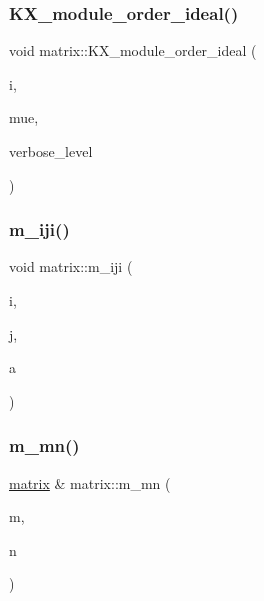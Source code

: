\mbox{\label{classmatrix_a69a80605be7914af5fd65e680944aeca}} 
\subsubsection{\texorpdfstring{K\+X\+\_\+module\+\_\+order\+\_\+ideal()}{KX\_module\_order\_ideal()}}
{\footnotesize\ttfamily void matrix\+::\+K\+X\+\_\+module\+\_\+order\+\_\+ideal (\begin{DoxyParamCaption}\item[{\mbox{\hyperlink{galois_8h_a09fddde158a3a20bd2dcadb609de11dc}{I\+NT}}}]{i,  }\item[{\mbox{\hyperlink{classunipoly}{unipoly}} \&}]{mue,  }\item[{\mbox{\hyperlink{galois_8h_a09fddde158a3a20bd2dcadb609de11dc}{I\+NT}}}]{verbose\+\_\+level }\end{DoxyParamCaption})}

\mbox{\label{classmatrix_a8cece141dbb3d39e94933c8da46dbd50}} 
\subsubsection{\texorpdfstring{m\+\_\+iji()}{m\_iji()}}
{\footnotesize\ttfamily void matrix\+::m\+\_\+iji (\begin{DoxyParamCaption}\item[{\mbox{\hyperlink{galois_8h_a09fddde158a3a20bd2dcadb609de11dc}{I\+NT}}}]{i,  }\item[{\mbox{\hyperlink{galois_8h_a09fddde158a3a20bd2dcadb609de11dc}{I\+NT}}}]{j,  }\item[{\mbox{\hyperlink{galois_8h_a09fddde158a3a20bd2dcadb609de11dc}{I\+NT}}}]{a }\end{DoxyParamCaption})\hspace{0.3cm}{\ttfamily [inline]}}

\mbox{\label{classmatrix_a85921e1b3c604f625989b1c3d1697792}} 
\subsubsection{\texorpdfstring{m\+\_\+mn()}{m\_mn()}}
{\footnotesize\ttfamily \mbox{\hyperlink{classmatrix}{matrix}} \& matrix\+::m\+\_\+mn (\begin{DoxyParamCaption}\item[{\mbox{\hyperlink{galois_8h_a09fddde158a3a20bd2dcadb609de11dc}{I\+NT}}}]{m,  }\item[{\mbox{\hyperlink{galois_8h_a09fddde158a3a20bd2dcadb609de11dc}{I\+NT}}}]{n }\end{DoxyParamCaption})}

